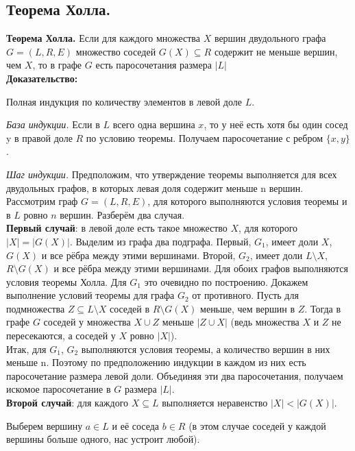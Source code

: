 \subsection{Теорема Холла.}

\textbf{Теорема Холла.} Если для каждого множества $X$ вершин двудольного графа $G = (L, R, E)$ множество соседей $G(X) \subseteq R$ содержит не меньше вершин, чем $X$, то в графе $G$ есть паросочетания размера $|L|$ \\

\noindent \textbf{Доказательство:}

Полная индукция по количеству элементов в левой доле $L$.

\textit{База индукции.} Если в $L$ всего одна вершина $x$, то у неё есть хотя бы один сосед y в правой доле $R$ по условию теоремы. Получаем паросочетание с ребром $\{x, y\}$.

\textit{Шаг индукции.} Предположим, что утверждение теоремы выполняется для всех двудольных графов, в которых левая доля содержит меньше n вершин. Рассмотрим граф $G = (L, R, E)$, для которого выполняются условия теоремы и в $L$ ровно $n$ вершин. Разберём два случая. \\

\textbf{Первый случай}: в левой доле есть такое множество $X$, для которого $|X| = |G(X)|$. Выделим из графа два подграфа. Первый, $G_1$, имеет доли $X$, $G(X)$ и все рёбра между этими вершинами. Второй, $G_2$, имеет доли $L \setminus X$, $R \setminus G(X)$ и все рёбра между этими вершинами. Для обоих графов выполняются условия теоремы Холла. Для $G_1$ это очевидно по построению. Докажем выполнение условий теоремы для графа $G_2$ от противного. Пусть для подмножества $Z \subseteq L \setminus X$ соседей в $R \setminus G(X)$ меньше, чем вершин в $Z$. Тогда в графе $G$ соседей у множества $X \cup Z$ меньше $|Z \cup X|$ (ведь множества $X$ и $Z$ не пересекаются, а соседей у $X$ ровно $|X|$). \\ 

Итак, для $G_1$, $G_2$ выполняются условия теоремы, а количество вершин в них меньше n. Поэтому по предположению индукции в каждом из них есть паросочетание размера левой доли. Объединяя эти два паросочетания, получаем искомое паросочетание в $G$ размера $|L|.$ \\

\textbf{Второй случай}: для каждого $X \subseteq L$ выполняется неравенство $|X| < |G(X)|$.

Выберем вершину $a \in L$ и её соседа $b \in R$ (в этом случае соседей у каждой вершины больше одного, нас устроит любой).

